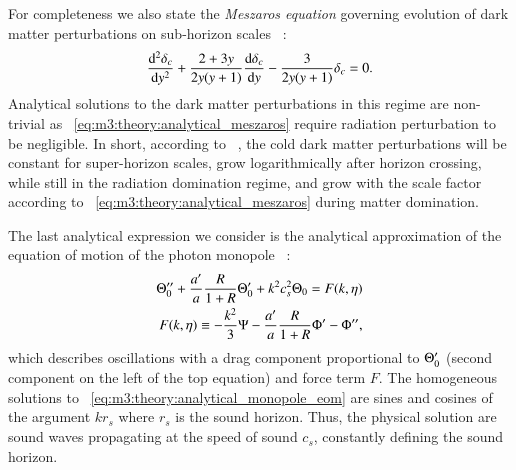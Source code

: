     For completeness we also state the \textit{Meszaros equation} governing evolution of dark matter perturbations on sub-horizon scales ~\cite[Eq. 8.59]{dodelson2020modern}:
    \begin{equation}\label{eq:m3:theory:analytical_meszaros}
        \dv[2]{\delta_c}{y} + \frac{2+3y}{2y(y+1)}\dv{\delta_c}{y} - \frac{3}{2y(y+1)}\delta_c = 0.
    \end{equation}
    Analytical solutions to the dark matter perturbations in this regime are non-trivial as ~\cref{eq:m3:theory:analytical_meszaros} require radiation perturbation to be negligible. In short, according to ~\cite{dodelson2020modern}, the cold dark matter perturbations will be constant for super-horizon scales, grow logarithmically after horizon crossing, while still in the radiation domination regime, and grow with the scale factor according to ~\cref{eq:m3:theory:analytical_meszaros} during matter domination. 

    The last analytical expression we consider is the analytical approximation of the equation of motion of the photon monopole ~\cite[Eq. 9.20]{dodelson2020modern}:
    \begin{equation}\label{eq:m3:theory:analytical_monopole_eom}
        \begin{split}
            \Theta_0''+\frac{a'}{a}\frac{R}{1+R}\Theta_0'+k^2c_s^2\Theta_0 = F(k,\eta) \\
            F(k,\eta) \equiv -\frac{k^2}{3}\Psi - \frac{a'}{a}\frac{R}{1+R}\Phi' - \Phi'',
        \end{split}
    \end{equation}
    which describes oscillations with a drag component proportional to $\Theta_0'$ (second component on the left of the top equation) and force term $F$. The homogeneous solutions to ~\cref{eq:m3:theory:analytical_monopole_eom} are sines and cosines of the argument $k r_s$ where $r_s$ is the sound horizon. Thus, the physical solution are sound waves propagating at the speed of sound $c_s$,  constantly defining the sound horizon. 